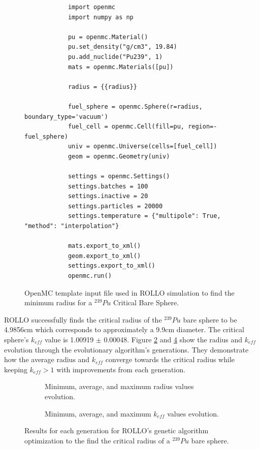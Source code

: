 \begin{figure}[H]
    \begin{verbatim}
            import openmc 
            import numpy as np

            pu = openmc.Material()
            pu.set_density("g/cm3", 19.84)
            pu.add_nuclide("Pu239", 1)
            mats = openmc.Materials([pu])
            
            radius = {{radius}}
            
            fuel_sphere = openmc.Sphere(r=radius, boundary_type='vacuum')
            fuel_cell = openmc.Cell(fill=pu, region=-fuel_sphere)
            univ = openmc.Universe(cells=[fuel_cell])
            geom = openmc.Geometry(univ)
            
            settings = openmc.Settings()
            settings.batches = 100
            settings.inactive = 20
            settings.particles = 20000
            settings.temperature = {"multipole": True, "method": "interpolation"}
            
            mats.export_to_xml()
            geom.export_to_xml()
            settings.export_to_xml()
            openmc.run()
    \end{verbatim}
    \caption{OpenMC template input file used in ROLLO simulation to find the 
    minimum radius for a $^{239}Pu$ Critical Bare Sphere.}
    \label{fig:critical_sphere.py}
\end{figure}  

\gls{ROLLO} successfully finds the critical radius of the $^{239}Pu$ bare sphere 
to be 4.9856cm which corresponds to approximately a 9.9cm diameter. 
The critical sphere's $k_{eff}$ value is 1.00919 $\pm$ 0.00048. 
Figure \ref{fig:verification-radius} and \ref{fig:verification-keff} show the 
radius and $k_{eff}$ evolution through the evolutionary algorithm's 
generations. 
They demonstrate how the average radius and $k_{eff}$ converge
towards the critical radius while keeping $k_{eff} > 1$ with improvements from 
each generation.
\begin{figure}[]
    \centering
    \begin{subfigure}{\textwidth}
    \caption{Minimum, average, and maximum radius values evolution.}
    \label{fig:verification-radius}
    \end{subfigure}
    \begin{subfigure}{\textwidth}
        \caption{Minimum, average, and maximum $k_{eff}$ values evolution.}
        \label{fig:verification-keff}
    \end{subfigure}
    \caption{Results for each generation for \gls{ROLLO}'s genetic algorithm optimization 
    to the find the critical radius of a  $^{239}Pu$ bare sphere.}
\end{figure}

